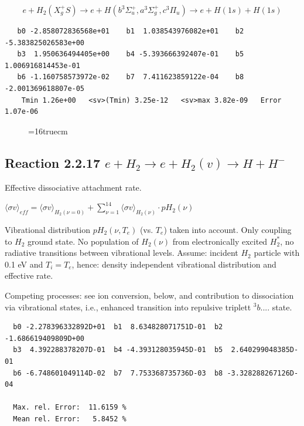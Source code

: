 \documentclass[12pt,dvips]{article}
\begin{document}
\begin{displaymath}
 e + H_2 (X_g^+ S ) \rightarrow e + H (b^3\Sigma^+_u , a^3\Sigma^+_g,
c^3\Pi_u)
             \rightarrow e + H(1s) + H(1s)
\end{displaymath}



\begin{small}\begin{verbatim}
   b0 -2.858072836568e+01    b1  1.038543976082e+01    b2 -5.383825026583e+00
   b3  1.950636494405e+00    b4 -5.393666392407e-01    b5  1.006916814453e-01
   b6 -1.160758573972e-02    b7  7.411623859122e-04    b8 -2.001369618807e-05
    Tmin 1.26e+00   <sv>(Tmin) 3.25e-12   <sv>max 3.82e-09   Error 1.07e-06
\end{verbatim}\end{small}
\begin{figure} \label{2.2.5.or}
\epsfxsize=16truecm
\end{figure}

 \newpage

\subsection{
Reaction 2.2.17  $e + H_2 \rightarrow e + H_2(v) \rightarrow H + H^-$
}
Effective dissociative attachment rate.

$ \langle\sigma v \rangle_{eff} = \langle\sigma v \rangle_{H_2(\nu=0)} + \sum_{\nu=1}^{14}
\langle\sigma v \rangle_{H_2(\nu)} \cdot pH_2(\nu) $

Vibrational distribution $pH_2(\nu,T_e)$ (vs. $T_e$) taken into
account. Only coupling
to $H_2$ ground state. No population of $H_2(\nu)$ from electronically
excited $H_2^*$, no radiative transitions between vibrational levels.
Assume: incident $H_2$ particle with 0.1 eV and $T_i = T_e$,
hence: density independent vibrational distribution and effective
rate.

Competing processes: see ion conversion, below, and contribution to
dissociation via vibrational states, i.e., enhanced transition into
repulsive triplett $^3b....$ state.

\begin{small}\begin{verbatim}
  b0 -2.278396332892D+01  b1  8.634828071751D-01  b2 -1.686619409809D+00
  b3  4.392288378207D-01  b4 -4.393128035945D-01  b5  2.640299048385D-01
  b6 -6.748601049114D-02  b7  7.753368735736D-03  b8 -3.328288267126D-04

  Max. rel. Error:  11.6159 %
  Mean rel. Error:   5.8452 %
\end{verbatim}\end{small}
\end{document}
